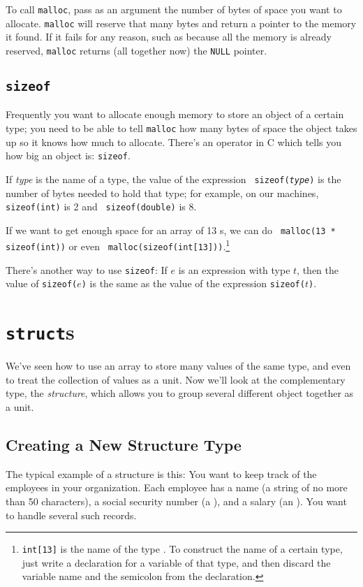 To call {\tt malloc}, pass as an argument the number of bytes of space
you want to allocate.  {\tt malloc} will reserve that many bytes and
return a pointer to the memory it found.  If it fails for any reason,
such as because all the memory is already reserved, {\tt malloc} returns
(all together now) the {\tt NULL} pointer.  

\subsection{{\tt sizeof}}

Frequently you want to allocate enough memory to store an object of a
certain type; you need to be able to tell {\tt malloc} how many bytes of
space the object takes up so it knows how much to allocate.  There's an
operator in C which tells you how big an object is: {\tt sizeof}. 

If {\em type} is the name of a type, the value of the expression {\tt
sizeof({\em type}\/)} is the number of bytes needed to hold that type;
for example, on our machines, {\tt sizeof(int)} is 2 and {\tt
sizeof(double)} is 8.  

If we want to get enough space for an array of 13 \int s, we can do {\tt
malloc(13 * sizeof(int))} or even {\tt
malloc(sizeof(int[13]))}.\footnote{{\tt int[13]} is the name of the type
.  To construct the name of a certain type, just write a
declaration for a variable of that type, and then discard the variable
name and the semicolon from the declaration.}

There's another way to use {\tt sizeof}: If $e$ is an expression with
type $t$, then the value of {\tt sizeof($e$)} is the same as the value
of the expression {\tt sizeof($t$)}.

\section{{\tt struct}s}

We've seen how to use an array to store many values of the same type,
and even to treat the collection of values as a unit.  Now we'll look at
the complementary type, the {\em structure}\/, which allows you to group
several different object together as a unit.

\subsection{Creating a New Structure Type}

The typical example of a structure is this:  You want to keep track of
the employees in your organization.  Each employee has a name (a string
of no more than 50 characters), a social security number (a \longint),
and a salary (an \int).  You want to handle several such records.


